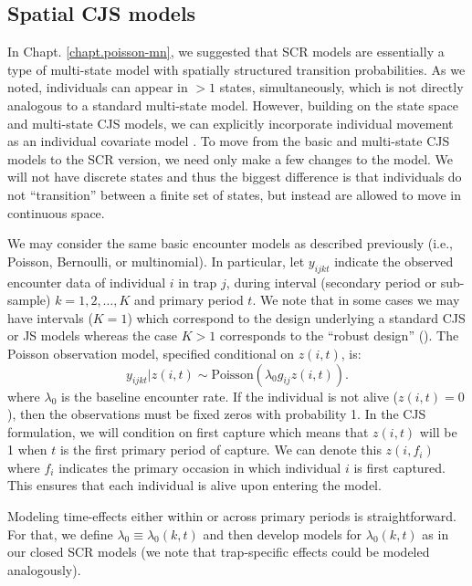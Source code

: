 
\subsection{Spatial CJS models}

In Chapt. \ref{chapt.poisson-mn}, we suggested that SCR models are 
essentially a type of multi-state model with spatially structured
transition probabilities.  As we noted, individuals can appear in $>1$
states, simultaneously, which is not directly analogous to a standard
multi-state model.  However, building on the state space and
multi-state CJS models, we can explicitly incorporate individual
movement as an individual covariate model \citep{royle_indcov:2007}.
To move from the basic and multi-state CJS models to the SCR version,
we need only make a few changes to the model.  We will
not have discrete states and thus the biggest difference is that
individuals do not ``transition'' between a finite set of states, but
instead are allowed to move in continuous space.

We may consider the same basic encounter
models as described previously (i.e., Poisson, Bernoulli, or
multinomial). In particular, let $y_{ijkt}$ indicate the observed
encounter data of individual $i$ in trap $j$, during interval
(secondary period or sub-sample) $k=1,2,\ldots,K$ and primary period $t$. We note that in
some cases we may have intervals ($K=1$) which correspond to the
design underlying a standard CJS or JS models whereas the case $K>1$
corresponds to the ``robust design'' (\citealt{pollock:1982}).  The
Poisson observation model, specified conditional on $z(i,t)$, is:
 \[
  y_{ijkt}|z(i,t) \sim  \mbox{Poisson}(\lambda_0 g_{ij} z(i,t)).
\]
where $\lambda_{0}$ is the baseline encounter rate.
If the
individual is not alive ($z(i,t)=0$), then the observations must be
fixed zeros with probability 1.   In the CJS formulation, we will condition on first capture
which means that $z(i,t)$ will
be 1 when $t$ is the first primary period of capture.  We can denote this $z(i, f_i)$
where $f_i$ indicates the primary occasion in which individual $i$ is first captured.
This ensures that each individual is alive upon entering the model.

Modeling time-effects either
within or across primary periods
is straightforward. For that, we define $\lambda_{0} \equiv
\lambda_{0}(k,t)$ and then develop models for
$\lambda_{0}(k,t)$ as in our closed SCR models (we note that
trap-specific effects could be modeled analogously).

